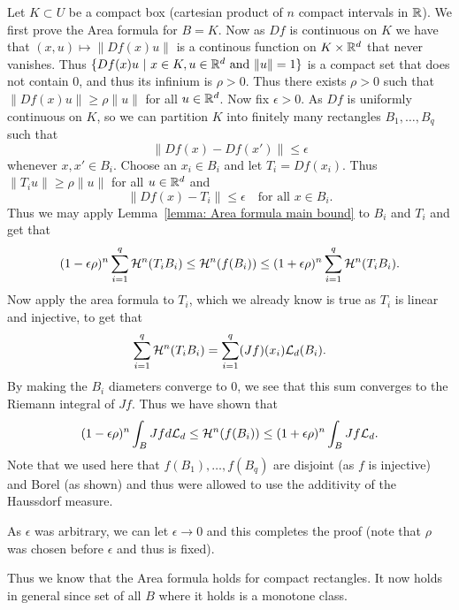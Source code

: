 \documentclass[twoside, a4paper, 10pt]{amsart}
\begin{document}
Let $K \subset U$ be a compact box (cartesian product of $n$ compact intervals in $\mathbb{R}$). We first prove the Area formula for $B = K$. Now as $Df$ is continuous on $K$ we have that $(x, u) \mapsto \| Df(x)u \|$ is a continous function on $K \times \mathbb{R}^d$ that never vanishes. Thus $\{Df(x)u ~|~ x \in K, u \in \mathbb{R}^d \text{ and } \|u\|= 1\}$ is a compact set that does not contain $0$, and thus its infinium is $\rho > 0$. Thus there exists $\rho>0$ such that $\| Df(x)u \| \geq \rho \|u\|$ for all $u \in \mathbb{R}^d$. Now fix $\epsilon > 0$. As $Df$ is uniformly continuous on $K$, so we can partition $K$ into finitely many rectangles $B_1, \ldots, B_q$ such that $$\|Df(x) - Df(x')\| \leq \epsilon$$ whenever $x,x' \in B_i$. Choose an $x_i \in B_i$ and let $T_i = Df(x_i)$. Thus $\|T_iu\| \geq \rho \|u\|$ for all $u \in \mathbb{R}^d$ and $$\| Df(x) - T_i\| \leq \epsilon \quad\text{for all }x \in B_i.$$ Thus we may apply Lemma~\ref{lemma: Area formula main bound} to $B_i$ and $T_i$ and get that 
$$(1-\epsilon \rho)^n \sum_{i=1}^q \mathcal{H}^n(T_iB_i)\leq \mathcal{H}^n(f(B_i)) \leq (1+\epsilon \rho)^n \sum_{i=1}^q\mathcal{H}^n(T_iB_i).$$
Now apply the area formula to $T_i$, which we already know is true as $T_i$ is linear and injective, to get that $$\sum_{i=1}^q \mathcal{H}^n(T_iB_i) = \sum_{i=1}^q  (Jf)(x_i) \mathcal{L}_d(B_i).$$ By making the $B_i$ diameters converge to $0$, we see that this sum converges to the Riemann integral of $Jf$. Thus we have shown that $$ (1-\epsilon \rho)^n  \int_{B} Jf d\mathcal{L}_d \leq \mathcal{H}^n(f(B_i)) \leq (1 + \epsilon \rho)^n \int_{B} Jf \mathcal{L}_d.$$ Note that we used here that $f(B_1), \ldots, f(B_q)$ are disjoint (as $f$ is injective) and Borel (as shown) and thus were allowed to use the additivity of the Haussdorf measure.

As $\epsilon$ was arbitrary, we can let $\epsilon \to 0$ and this completes the proof (note that $\rho$ was chosen before $\epsilon$ and thus is fixed).

Thus we know that the Area formula holds for compact rectangles. It now holds in general since set of all $B$ where it holds is a monotone class.
\end{document}
